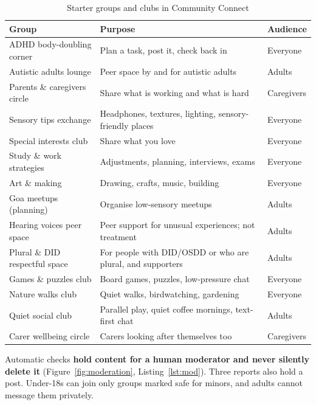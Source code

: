 \documentclass[11pt,a4paper]{article}
\begin{document}
\begin{table}[H]
\centering
\caption{Starter groups and clubs in Community Connect}
\label{tab:groups}
\small
\begin{tabularx}{\textwidth}{@{}lYl@{}}
\toprule
\textbf{Group} & \textbf{Purpose} & \textbf{Audience}\\
\midrule
ADHD body-doubling corner & Plan a task, post it, check back in & Everyone\\
Autistic adults lounge & Peer space by and for autistic adults & Adults\\
Parents \& caregivers circle & Share what is working and what is hard & Caregivers\\
Sensory tips exchange & Headphones, textures, lighting, sensory-friendly places & Everyone\\
Special interests club & Share what you love & Everyone\\
Study \& work strategies & Adjustments, planning, interviews, exams & Everyone\\
Art \& making & Drawing, crafts, music, building & Everyone\\
Goa meetups (planning) & Organise low-sensory meetups & Adults\\
Hearing voices peer space & Peer support for unusual experiences; not treatment & Adults\\
Plural \& DID respectful space & For people with DID/OSDD or who are plural, and supporters & Adults\\
Games \& puzzles club & Board games, puzzles, low-pressure chat & Everyone\\
Nature walks club & Quiet walks, birdwatching, gardening & Everyone\\
Quiet social club & Parallel play, quiet coffee mornings, text-first chat & Adults\\
Carer wellbeing circle & Carers looking after themselves too & Caregivers\\
\bottomrule
\end{tabularx}
\end{table}

Automatic checks \textbf{hold content for a human moderator and never silently delete it}
(Figure~\ref{fig:moderation}, Listing~\ref{lst:mod}). Three reports also hold a post. Under-18s can
join only groups marked safe for minors, and adults cannot message them privately.
\end{document}
